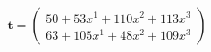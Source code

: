 \documentclass[preview]{standalone}
\begin{document}
\begin{align*}
\mathbf{t} = \begin{pmatrix}50 + 53x^{1} + 110x^{2} + 113x^{3} \\ 63 + 105x^{1} + 48x^{2} + 109x^{3}\end{pmatrix}
\end{align*}
\end{document}
